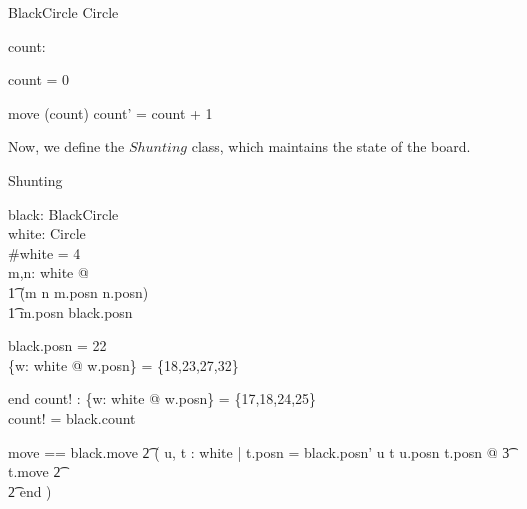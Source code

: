 \documentclass[11pt,a4paper]{article}
\begin{document}
\begin{class}{BlackCircle}
\also
\inherits Circle\\

\begin{state}
  count: \nat
\end{state}

\begin{init}
  count = 0
\end{init}

\begin{op}{move}
  \Delta(count)
\where
  count' = count + 1
\end{op}
\end{class}

Now, we define the $Shunting$ class, which maintains the state of the
board.

\begin{class}{Shunting}
\also
\begin{state}
  black: BlackCircle \\
  white: \power Circle \\
\where
  \#white = 4 \\
  \forall m,n: white @ \\
      \t1 (m \neq n \iff m.posn \neq n.posn) \land \\
      \t1 m.posn \neq black.posn
\end{state}

\begin{init}
  black.posn = 22 \\
  \{w: white @ w.posn\} = \{18,23,27,32\} \\ 
\end{init}
 
\begin{op}{end}
  count! : \nat
\where
  \{w: white @ w.posn\} = \{17,18,24,25\} \\
  count! = black.count
\end{op} 

move == black.move \land
         \t2 ( \dgch u, t : white | t.posn = black.posn' \land
                u \neq t \land u.posn \neq t.posn @
		\t3 t.move
		\t2 \gch \\
		\t2 end )
\end{class}
\end{document}
